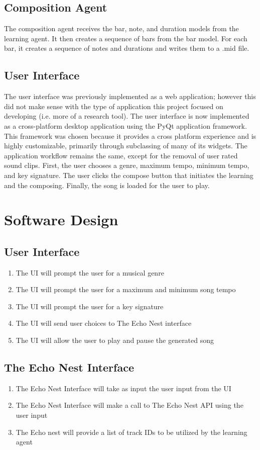 \documentclass{article}
\begin{document}
\subsection{Composition Agent}
The composition agent receives the bar, note, and duration models from the learning agent. It then creates a sequence of bars from the bar model. For each bar, it creates a sequence of notes and durations and writes them to a .mid file.

\subsection{User Interface}
The user interface was previously implemented as a web application; however this did not make sense with the type of application this project focused on developing (i.e. more of a research tool). The user interface is now implemented as a cross-platform desktop application using the PyQt application framework. This framework was chosen because it provides a cross platform experience and is highly customizable, primarily through subclassing of many of its widgets. The application workflow remains the same, except for the removal of user rated sound clips. First, the user chooses a genre, maximum tempo, minimum tempo, and key signature.  The user clicks the compose button that initiates the learning and the composing.  Finally, the song is loaded for the user to play.

\section{Software Design}
\subsection{User Interface}
 \begin{enumerate}
  \item The UI will prompt the user for a musical genre
  \item The UI will prompt the user for a maximum and minimum song tempo
  \item The UI will prompt the user for a key signature
  \item The UI will send user choices to The Echo Nest interface
  \item The UI will allow the user to play and pause the generated song
  \end{enumerate}

\subsection{The Echo Nest Interface}
 \begin{enumerate}
 \item The Echo Nest Interface will take as input the user input from the UI
 \item The Echo Nest Interface will make a call to The Echo Nest API using the user input
  \item The Echo nest will provide a list of track IDs to be utilized by the learning agent
  \end{enumerate}
\end{document}

